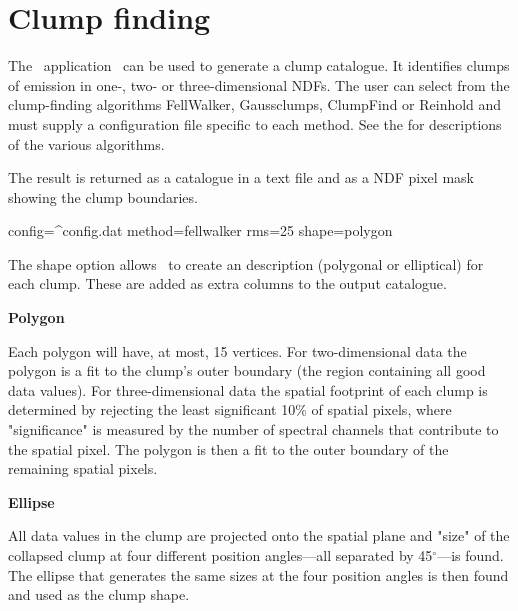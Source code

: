 \documentclass[11pt,oneside,chapters]{starlink}
\begin{document}
\section{Clump finding}
\label{sec:clumps}
\label{sec:clumpfind}

The \cupid\ application \findclumps\ can be used to generate a clump
catalogue. It identifies clumps of emission in one-, two- or
three-dimensional NDFs. The user can select from the clump-finding
algorithms FellWalker, Gaussclumps, ClumpFind or Reinhold and must
supply a configuration file specific to each method. See the
 for descriptions of the various
algorithms.

The result is returned as a catalogue in a text file and as a NDF
pixel mask showing the clump boundaries.

\begin{terminalv}
  config=^config.dat method=fellwalker rms=25 shape=polygon
\end{terminalv}

The shape option allows \findclumps\ to create an
description (polygonal or elliptical) for each clump. These are added
as extra columns to the output catalogue.


\begin{minipage}[t]{0.12\linewidth}
\textbf{Polygon}
\end{minipage}
\begin{minipage}[t]{0.85\linewidth}
Each polygon will have, at most, 15 vertices. For two-dimensional data
the polygon is a fit to the clump's outer boundary (the region
containing all good data values). For three-dimensional data the
spatial footprint of each clump is determined by rejecting the least
significant 10\% of spatial pixels, where "significance" is measured
by the number of spectral channels that contribute to the spatial
pixel. The polygon is then a fit to the outer boundary of the
remaining spatial pixels.

\end{minipage}

\begin{minipage}[t]{0.12\linewidth}
\textbf{Ellipse}
\end{minipage}
\begin{minipage}[t]{0.85\linewidth}
All data values in the clump are projected onto the spatial plane and
"size" of the collapsed clump at four different position angles---all
separated by 45$^\circ$---is found. The ellipse that generates the
same sizes at the four position angles is then found and used as the
clump shape.
\end{minipage}
\end{document}
